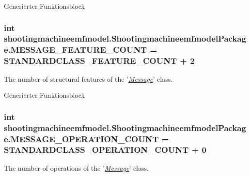Generierter Funktionsblock  \hypertarget{interfaceshootingmachineemfmodel_1_1_shootingmachineemfmodel_package_aebbfc790024953cdc7c3f7d721c99cfc}{
\subsubsection[{M\-E\-S\-S\-A\-G\-E\-\_\-\-F\-E\-A\-T\-U\-R\-E\-\_\-\-C\-O\-U\-N\-T}]{\setlength{\rightskip}{0pt plus 5cm}int shootingmachineemfmodel.\-Shootingmachineemfmodel\-Package.\-M\-E\-S\-S\-A\-G\-E\-\_\-\-F\-E\-A\-T\-U\-R\-E\-\_\-\-C\-O\-U\-N\-T = {\bf S\-T\-A\-N\-D\-A\-R\-D\-C\-L\-A\-S\-S\-\_\-\-F\-E\-A\-T\-U\-R\-E\-\_\-\-C\-O\-U\-N\-T} + 2}}\label{interfaceshootingmachineemfmodel_1_1_shootingmachineemfmodel_package_aebbfc790024953cdc7c3f7d721c99cfc}
The number of structural features of the '{\itshape \hyperlink{interfaceshootingmachineemfmodel_1_1_message}{Message}}' class.

Generierter Funktionsblock  \hypertarget{interfaceshootingmachineemfmodel_1_1_shootingmachineemfmodel_package_a6326f815e736e221ea20b98e0ccf391b}{
\subsubsection[{M\-E\-S\-S\-A\-G\-E\-\_\-\-O\-P\-E\-R\-A\-T\-I\-O\-N\-\_\-\-C\-O\-U\-N\-T}]{\setlength{\rightskip}{0pt plus 5cm}int shootingmachineemfmodel.\-Shootingmachineemfmodel\-Package.\-M\-E\-S\-S\-A\-G\-E\-\_\-\-O\-P\-E\-R\-A\-T\-I\-O\-N\-\_\-\-C\-O\-U\-N\-T = {\bf S\-T\-A\-N\-D\-A\-R\-D\-C\-L\-A\-S\-S\-\_\-\-O\-P\-E\-R\-A\-T\-I\-O\-N\-\_\-\-C\-O\-U\-N\-T} + 0}}\label{interfaceshootingmachineemfmodel_1_1_shootingmachineemfmodel_package_a6326f815e736e221ea20b98e0ccf391b}
The number of operations of the '{\itshape \hyperlink{interfaceshootingmachineemfmodel_1_1_message}{Message}}' class.

